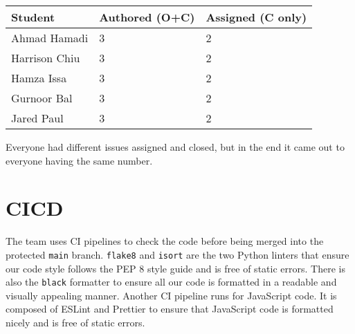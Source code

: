 \documentclass{article}
\begin{document}

\begin{table}[H]
\centering
\begin{tabular}{lll}
\toprule
\textbf{Student} & \textbf{Authored (O+C)} & \textbf{Assigned (C only)}\\
\midrule
Ahmad Hamadi & 3 & 2 \\
Harrison Chiu & 3 & 2 \\
Hamza Issa & 3 & 2 \\
Gurnoor Bal & 3 & 2 \\
Jared Paul & 3 & 2 \\
\bottomrule
\end{tabular}
\end{table}

Everyone had different issues assigned and closed, but in the end it came out to everyone having the same number.

\section{CICD}

The team uses CI pipelines to check the code before being merged into the protected \verb|main| branch. 
\verb|flake8| and \verb|isort| are the two Python linters that ensure our code style follows the PEP 8 
style guide and is free of static errors. There is also the \verb|black| formatter to ensure all our code
is formatted in a readable and visually appealing manner. Another CI pipeline runs for JavaScript code.
It is composed of ESLint and Prettier to ensure that JavaScript code is formatted nicely and is free of 
static errors.
\end{document}
